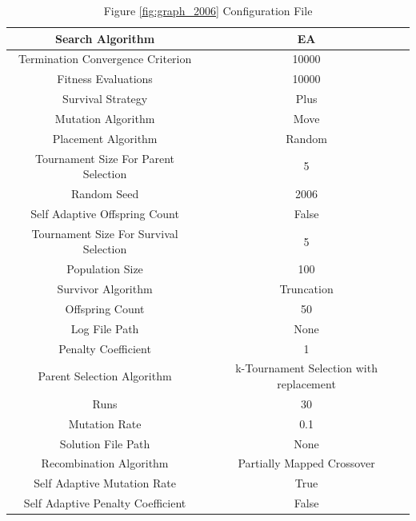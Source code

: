 \documentclass{standalone}
\begin{document}
\begin{table}[!htb]
	\centering
	\caption{Figure \ref{fig:graph_2006} Configuration File}
	\label{tab:graph_2006}
	\begin{tabular}{| c | c |}
		\hline
		Search Algorithm		& EA		 \\
		\hline
		Termination Convergence Criterion		& 10000		 \\
		\hline
		Fitness Evaluations		& 10000		 \\
		\hline
		Survival Strategy		& Plus		 \\
		\hline
		Mutation Algorithm		& Move		 \\
		\hline
		Placement Algorithm		& Random		 \\
		\hline
		Tournament Size For Parent Selection		& 5		 \\
		\hline
		Random Seed		& 2006		 \\
		\hline
		Self Adaptive Offspring Count		& False		 \\
		\hline
		Tournament Size For Survival Selection		& 5		 \\
		\hline
		Population Size		& 100		 \\
		\hline
		Survivor Algorithm		& Truncation		 \\
		\hline
		Offspring Count		& 50		 \\
		\hline
		Log File Path		& None		 \\
		\hline
		Penalty Coefficient		& 1		 \\
		\hline
		Parent Selection Algorithm		& k-Tournament Selection with replacement		 \\
		\hline
		Runs		& 30		 \\
		\hline
		Mutation Rate		& 0.1		 \\
		\hline
		Solution File Path		& None		 \\
		\hline
		Recombination Algorithm		& Partially Mapped Crossover		 \\
		\hline
		Self Adaptive Mutation Rate		& True		 \\
		\hline
		Self Adaptive Penalty Coefficient		& False		 \\
		\hline
	\end{tabular}
\end{table}
\end{document}
